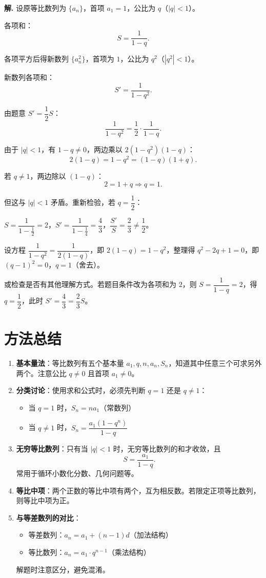 \documentclass[11pt]{ctexrep}
\begin{document}
\textbf{解.} 设原等比数列为 $\{a_n\}$，首项 $a_1 = 1$，公比为 $q$（$|q| < 1$）。

各项和：
\[
    S = \frac{1}{1-q}.
\]

各项平方后得新数列 $\{a_n^2\}$，首项为 $1$，公比为 $q^2$（$|q^2| < 1$）。

新数列各项和：
\[
    S' = \frac{1}{1-q^2}.
\]

由题意 $S' = \dfrac{1}{2}S$：
\[
    \frac{1}{1-q^2} = \frac{1}{2} \cdot \frac{1}{1-q}.
\]

由于 $|q| < 1$，有 $1-q \neq 0$，两边乘以 $2(1-q^2)(1-q)$：
\[
    2(1-q) = 1-q^2 = (1-q)(1+q).
\]

若 $q \neq 1$，两边除以 $(1-q)$：
\[
    2 = 1 + q \Rightarrow q = 1.
\]

但这与 $|q| < 1$ 矛盾。重新检验，若 $q = \dfrac{1}{2}$：

$S = \dfrac{1}{1-\frac{1}{2}} = 2$，$S' = \dfrac{1}{1-\frac{1}{4}} = \dfrac{4}{3}$，$\dfrac{S'}{S} = \dfrac{2}{3} \neq \dfrac{1}{2}$。

设方程 $\dfrac{1}{1-q^2} = \dfrac{1}{2(1-q)}$，即 $2(1-q) = 1-q^2$，整理得 $q^2 - 2q + 1 = 0$，即 $(q-1)^2 = 0$，$q = 1$（舍去）。

或检查是否有其他理解方式。若题目条件改为各项和为 $2$，则 $S = \dfrac{1}{1-q} = 2$，得 $q = \dfrac{1}{2}$，此时 $S' = \dfrac{4}{3} = \dfrac{2}{3}S$。

\section*{方法总结}

\begin{enumerate}
    \item \textbf{基本量法}：等比数列有五个基本量 $a_1, q, n, a_n, S_n$，知道其中任意三个可求另外两个。注意公比 $q \neq 0$ 且首项 $a_1 \neq 0$。
    
    \item \textbf{分类讨论}：使用求和公式时，必须先判断 $q = 1$ 还是 $q \neq 1$：
    \begin{itemize}
        \item 当 $q = 1$ 时，$S_n = na_1$（常数列）
        \item 当 $q \neq 1$ 时，$S_n = \dfrac{a_1(1-q^n)}{1-q}$
    \end{itemize}
    
    \item \textbf{无穷等比数列}：只有当 $|q| < 1$ 时，无穷等比数列的和才收敛，且
    \[
        S = \frac{a_1}{1-q}.
    \]
    常用于循环小数化分数、几何问题等。
    
    \item \textbf{等比中项}：两个正数的等比中项有两个，互为相反数。若限定正项等比数列，则等比中项为正。
    
    \item \textbf{与等差数列的对比}：
    \begin{itemize}
        \item 等差数列：$a_n = a_1 + (n-1)d$（加法结构）
        \item 等比数列：$a_n = a_1 \cdot q^{n-1}$（乘法结构）
    \end{itemize}
    解题时注意区分，避免混淆。
\end{enumerate}
\end{document}
